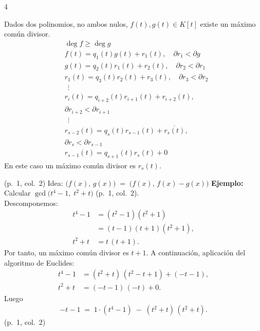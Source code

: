 \documentclass[landscape,a4paper]{article}
\begin{document}
\begin{multicols}{4}
\vfill\null
\columnbreak
\begin{tcolorbox}[colback=white,colframe=red!80!black,colbacktitle=red!80!black,coltitle=white,title=Teorema: Algoritmo de Euclides]
Dados dos polinomios, no ambos nulos, $f(t),g(t)\in K[t]$ existe un máximo común divisor.
\begin{align*}
  &\deg f \ge \deg g \\
  &f(t) = q_{1}(t)g(t) + r_{1}(t), \quad \partial r_{1} < \partial g \\
  &g(t) = q_{2}(t)r_{1}(t) + r_{2}(t), \quad \partial r_{2} < \partial r_{1} \\
  &r_{1}(t) = q_{3}(t)r_{2}(t) + r_{3}(t), \quad \partial r_{3} < \partial r_{2} \\
  &\ \ \vdots \nonumber \\
  &r_{i}(t) = q_{i+2}(t)r_{i+1}(t) + r_{i+2}(t), \quad \\ &\partial r_{i+2} < \partial r_{i+1} \\
  &\ \ \vdots \nonumber \\
  &r_{s-2}(t) = q_{s}(t)r_{s-1}(t) + \overline{r_{s}(t)}, \quad \\ &\partial r_{s} < \partial r_{s-1} \\
  &r_{s-1}(t) = q_{s+1}(t)r_{s}(t) + 0
\end{align*}
En este caso un máximo común divisor es $r_{s}(t)$.
\end{tcolorbox}
(p.~1, col.~2)
\noindent Idea: $\bigl(f(x),\,g(x)\bigr) \;=\;\bigl(f(x),\,f(x)-g(x)\bigr)$
\noindent \textbf{Ejemplo:} Calcular $\gcd\bigl(t^4-1,\;t^2+t\bigr)$ (p.~1, col.~2).\\
Descomponemos:
\begin{align*}
  t^4-1 &= (t^2-1)(t^2+1) \\ &= (t-1)(t+1)(t^2+1), \\
  t^2+t &= t\,(t+1).
\end{align*}
Por tanto, un máximo común divisor es $t+1$. A continuación, aplicación del algoritmo de Euclides:
\begin{align*}
  t^4 - 1 &= (t^2+t)\,(t^2 - t + 1) + (-t - 1), \\
  t^2 + t &= (-t - 1)\,(-t) + 0.
\end{align*}
Luego 
\begin{align*}
  -t - 1 \;=\; 1\cdot (t^4 - 1) \;-\; (t^2 + t)\,(t^2 + t).
\end{align*}
(p.~1, col.~2)
\columnbreak
\begin{tcolorbox}[colback=white,colframe=blue!80!black,colbacktitle=blue!80!black,coltitle=white,title={Definición: Irreducibilidad (p.~2, col.~1)}]

\end{tcolorbox}
\end{multicols}
\end{document}

